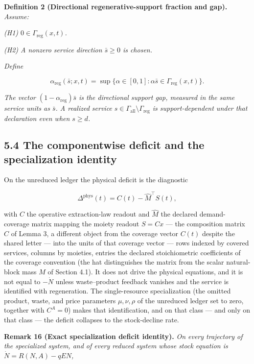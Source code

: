\documentclass[11pt]{article}
\begin{document}
\textbf{Definition 2 (Directional regenerative-support fraction and gap).} \emph{Assume:}

\emph{(H1) \(0 \in \Gamma_{\mathrm{reg}}(x,\allowbreak{}t)\).}

\emph{(H2) A nonzero service direction \(\bar s \ge 0\) is chosen.}

\emph{Define} 

$$\alpha_{\mathrm{reg}}(\bar s; x, t) = \sup\{ \alpha \in [0,1] : \alpha \bar s \in \Gamma_{\mathrm{reg}}(x,t) \}.$$

 \emph{The vector \((1 - \alpha_{\mathrm{reg}})\bar s\) is the directional support gap, measured in the same service units as \(\bar s\). A realized service \(s \in \Gamma_{\mathrm{all}} \setminus \Gamma_{\mathrm{reg}}\) is support-dependent under that declaration even when \(s \ge d\).}

\subsection*{5.4 The componentwise deficit and the specialization identity}\label{54-the-componentwise-deficit-and-the-specialization-identity}

On the unreduced ledger the physical deficit is the diagnostic 

$$\Delta^{\mathrm{phys}}(t) = C(t) - \widehat{M}^\top S(t),$$

 with \(C\) the operative extraction-law readout and \(\widehat{M}\) the declared demand-coverage matrix mapping the moiety readout \(S = Cx\) --- the composition matrix \(C\) of Lemma 3, a different object from the coverage vector \(C(t)\) despite the shared letter --- into the units of that coverage vector --- rows indexed by covered services, columns by moieties, entries the declared stoichiometric coefficients of the coverage convention (the hat distinguishes the matrix from the scalar natural-block mass \(M\) of Section 4.1). It does not drive the physical equations, and it is not equal to \(-\dot N\) unless waste--product feedback vanishes and the service is identified with regeneration. The single-resource specialization (the omitted product, waste, and price parameters \(\mu, \nu, \rho\) of the unreduced ledger set to zero, together with \(C^A = 0\)) makes that identification, and on that class --- and only on that class --- the deficit collapses to the stock-decline rate.

\textbf{Remark 16 (Exact specialization deficit identity).} \emph{On every trajectory of the specialized system, and of every reduced system whose stock equation is \(\dot N = R(N,A) - qEN\),} 
\end{document}

